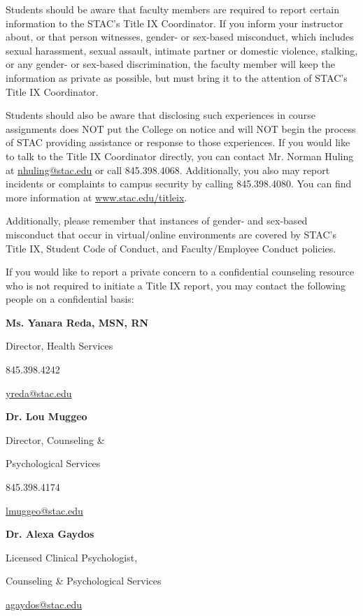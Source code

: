 \documentclass[11pt,letterpaper]{article}
\begin{document}

Students should be aware that faculty members are required to report certain information to the STAC’s Title IX Coordinator. If you inform your instructor about, or that person witnesses, gender- or sex-based misconduct, which includes sexual harassment, sexual assault, intimate partner or domestic violence, stalking, or any gender- or sex-based discrimination, the faculty member will keep the information as private as possible, but must bring it to the attention of STAC's Title IX Coordinator. \pspace

Students should also be aware that disclosing such experiences in course assignments does NOT put the College on notice and will NOT begin the process of STAC providing assistance or response to those experiences. If you would like to talk to the Title IX Coordinator directly, you can contact Mr. Norman Huling at \href{mailto:nhuling@stac.edu}{nhuling@stac.edu} or call 845.398.4068. Additionally, you also may report incidents or complaints to campus security by calling 845.398.4080. You can find more information at \url{www.stac.edu/titleix}. \pspace

Additionally, please remember that instances of gender- and sex-based misconduct that occur in virtual/online environments are covered by STAC's Title IX, Student Code of Conduct, and Faculty/Employee Conduct policies. \pspace

If you would like to report a private concern to a confidential counseling resource who is not required to initiate a Title IX report, you may contact the following people on a confidential basis: \pspace


        \hfill\begin{minipage}[t]{0.33\textwidth}
        {\bfseries Ms. Yanara Reda, MSN, RN} \par
        Director, Health Services \par
        845.398.4242 \par
        \href{mailto:yreda@stac.edu}{yreda@stac.edu}
        \end{minipage}\begin{minipage}[t]{0.3\textwidth}
        {\bfseries Dr. Lou Muggeo} \par
        Director, Counseling \& \par
        Psychological Services \par
        845.398.4174 \par
        \href{mailto:lmuggeo@stac.edu}{lmuggeo@stac.edu}
        \end{minipage}\begin{minipage}[t]{0.37\textwidth} 
        {\bfseries Dr. Alexa Gaydos} \par
        Licensed Clinical Psychologist, \par
        Counseling \& Psychological Services \par
        \href{mailto:agaydos@stac.edu}{agaydos@stac.edu}
        \end{minipage} \pspace
\end{document}
